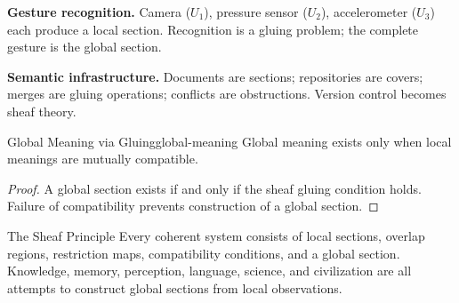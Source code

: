 \begin{example}
  \textbf{Gesture recognition.} Camera ($U_1$), pressure sensor ($U_2$),
  accelerometer ($U_3$) each produce a local section. Recognition is a
  gluing problem; the complete gesture is the global section.
\end{example}

\begin{example}
  \textbf{Semantic infrastructure.} Documents are sections; repositories
  are covers; merges are gluing operations; conflicts are obstructions.
  Version control becomes sheaf theory.
\end{example}

\begin{theorem}{Global Meaning via Gluing}{global-meaning}
  Global meaning exists only when local meanings are mutually compatible.
\end{theorem}
\begin{proof}
  A global section exists if and only if the sheaf gluing condition holds.
  Failure of compatibility prevents construction of a global section.
\end{proof}

\begin{namedthm}{The Sheaf Principle}
  Every coherent system consists of local sections, overlap regions,
  restriction maps, compatibility conditions, and a global section.
  Knowledge, memory, perception, language, science, and civilization
  are all attempts to construct global sections from local observations.
\end{namedthm}
